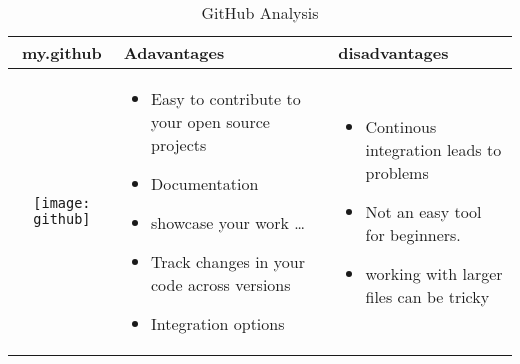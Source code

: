 \documentclass{article}
\begin{document}
	\begin{table}[h!]
		\centering
		\begin{tabular}{ | c | m{5cm} | m{5cm} | }
			\hline
			my.github & Adavantages & disadvantages \\ \hline
			\begin{minipage}{.4\textwidth}
				\texttt{[image: github]}
				\end{minipage}
			&
			\begin{itemize}
				\item Easy to contribute to your open source projects
				\item Documentation
				\item showcase your work \ldots
				\item Track changes in your code across versions
				\item Integration options
			\end{itemize}
		&
		\begin{itemize}
			\item Continous integration leads to problems
			\item Not an easy tool for beginners.
			\item working with larger files can be tricky
			\end{itemize}
	\\ \hline
\end{tabular}
\caption{GitHub Analysis}\label{tbl:mygithub}
\end{table}
\end{document}
